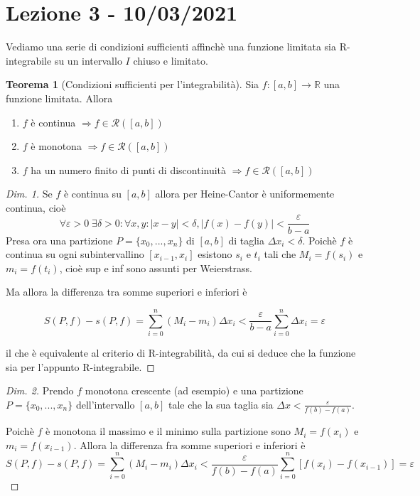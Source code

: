 \documentclass{article}
\theoremstyle{definition}
\newtheorem{theorem}{Teorema}[section]
\theoremstyle{definition}
\theoremstyle{definition}
\theoremstyle{definition}
\theoremstyle{definition}
\begin{document}
\newpage
\section{Lezione 3 - 10/03/2021}

Vediamo una serie di condizioni sufficienti affinchè una funzione limitata sia R-integrabile su un intervallo $I$ chiuso e limitato.

\begin{theorem}[Condizioni sufficienti per l'integrabilità]
    Sia $f:[a,b]\rightarrow \mathbb{R}$ una funzione limitata. Allora
    \begin{enumerate}
        \item $f$ è continua $\Rightarrow f \in \mathcal{R}([a,b])$
        \item $f$ è monotona $\Rightarrow f \in \mathcal{R}([a,b])$
        \item $f$ ha un numero finito di punti di discontinuità $\Rightarrow f \in \mathcal{R}([a,b])$
    \end{enumerate}
    
    \begin{proof}[Dim. 1]
        Se $f$ è continua su $[a,b]$ allora per Heine-Cantor è uniformemente continua, cioè
        \[
        \forall \varepsilon > 0 \; \exists \delta>0: \forall x,y: \left|x-y \right| < \delta, \left|f(x)-f(y)\right| < \frac{\varepsilon}{b-a}
        \]
        Presa ora una partizione $P=\lbrace x_0,...,x_n \rbrace$ di $[a,b]$ di taglia $\Delta x_i < \delta$. Poichè $f$ è continua su ogni subintervallino $[x_{i-1}, x_i]$ esistono $s_i$ e $t_i$ tali che $M_i=f(s_i)$ e $m_i=f(t_i)$, cioè sup e inf sono assunti per Weierstrass. 

        Ma allora la differenza tra somme superiori e inferiori è

        \[
        S(P,f) - s(P,f) = \displaystyle\sum_{i=0}^{n} (M_i-m_i)\Delta x_i < \frac{\varepsilon}{b-a}\displaystyle\sum_{i=0}^{n} \Delta x_i = \varepsilon
        \]  

        il che è equivalente al criterio di R-integrabilità, da cui si deduce che la funzione sia per l'appunto R-integrabile.
    \end{proof}
    \begin{proof}[Dim. 2]
        Prendo $f$ monotona crescente (ad esempio) e una partizione $P=\lbrace x_0,...,x_n \rbrace$ dell'intervallo $[a,b]$ tale che la sua taglia sia $\Delta x < \frac{\varepsilon}{f(b)-f(a)}$.

        Poichè $f$ è monotona il massimo e il minimo sulla partizione sono $M_i=f(x_i)$ e $m_i=f(x_{i-1})$. Allora la differenza fra somme superiori e inferiori è \[S(P,f) - s(P,f) = \sum_{i=0}^{n}(M_i-m_i)\Delta x_i < \frac{\varepsilon}{f(b)-f(a)} \sum_{i=0}^{n}[f(x_i)-f(x_{i-1})] = \varepsilon\]


\end{proof}
\end{theorem}
\end{document}
